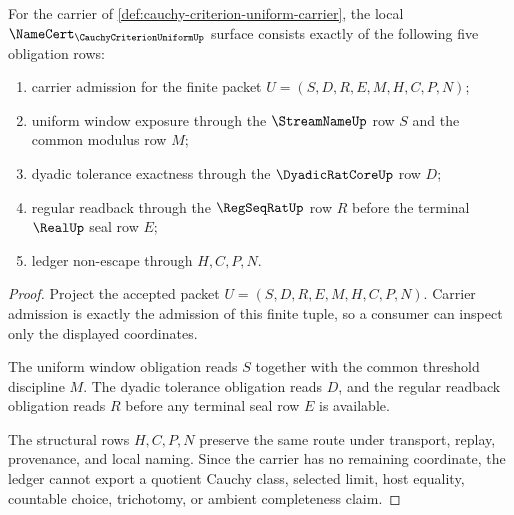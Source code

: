 \begin{theorem}
\label{thm:cauchy-criterion-uniform-namecert-obligations}
For the carrier of \autoref{def:cauchy-criterion-uniform-carrier}, the local $\NameCert_{\CauchyCriterionUniformUp}$ surface consists exactly of the following five obligation rows:
\begin{enumerate}
\item carrier admission for the finite packet $U=(S,D,R,E,M,H,C,P,N)$;
\item uniform window exposure through the $\StreamNameUp$ row $S$ and the common modulus row $M$;
\item dyadic tolerance exactness through the $\DyadicRatCoreUp$ row $D$;
\item regular readback through the $\RegSeqRatUp$ row $R$ before the terminal $\RealUp$ seal row $E$;
\item ledger non-escape through $H,C,P,N$.
\end{enumerate}
\end{theorem}
\begin{proof}
Project the accepted packet $U=(S,D,R,E,M,H,C,P,N)$. Carrier admission is exactly the admission of this finite tuple, so a consumer can inspect only the displayed coordinates.

The uniform window obligation reads $S$ together with the common threshold discipline $M$. The dyadic tolerance obligation reads $D$, and the regular readback obligation reads $R$ before any terminal seal row $E$ is available.

The structural rows $H,C,P,N$ preserve the same route under transport, replay, provenance, and local naming. Since the carrier has no remaining coordinate, the ledger cannot export a quotient Cauchy class, selected limit, host equality, countable choice, trichotomy, or ambient completeness claim.
\end{proof}

